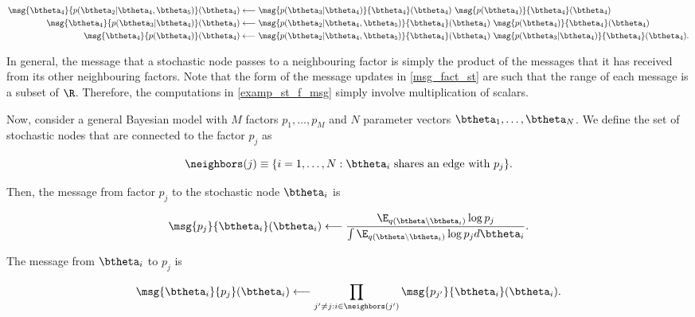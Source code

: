 \documentclass[12pt]{article}
\theoremstyle{plain}
\theoremstyle{definition}
\theoremstyle{remark}
\begin{document}
\begin{align}
\begin{split}
	\msg{\btheta_4}{p (\btheta_2 | \btheta_4, \btheta_5)} (\btheta_4)
		&\longleftarrow
			\msg{p (\btheta_3 | \btheta_4)}{\btheta_4} (\btheta_4) \
			\msg{p(\btheta_4)}{\btheta_4} (\btheta_4) \\
	\msg{\btheta_4}{p (\btheta_3 | \btheta_4)} (\btheta_4)
		&\longleftarrow
			\msg{p (\btheta_2 | \btheta_4, \btheta_5)}{\btheta_4} (\btheta_4) \
			\msg{p (\btheta_4)}{\btheta_4} (\btheta_4) \\
	\msg{\btheta_4}{p (\btheta_4)} (\btheta_4)
		&\longleftarrow
			\msg{p (\btheta_2 | \btheta_4, \btheta_5)}{\btheta_4} (\btheta_4) \
			\msg{p (\btheta_3 | \btheta_4)}{\btheta_4} (\btheta_4).
\end{split}
\label{examp_st_f_msg}
\end{align}

\noindent In general, the message that a stochastic node passes to a neighbouring factor is simply the product
of the messages that it has received from its other neighbouring factors. Note that the form of the message
updates in \eqref{msg_fact_st} are such that the range of each message is a subset of $\R$.
Therefore, the computations in \eqref{examp_st_f_msg} simply involve multiplication of scalars.

Now, consider a general Bayesian model with $M$ factors $p_1, \dots, p_M$ and $N$ parameter vectors
$\btheta_1, \dots, \btheta_N$. We define the set of stochastic nodes that are connected to the factor
$p_j$ as

\[
	\neighbors (j) \equiv \{ i = 1, \dots, N: \text{$\btheta_i$ shares an edge with $p_j$} \}.
\]

\noindent Then, the message from factor
$p_j$ to the stochastic node $\btheta_i$ is

\begin{equation}
	\msg{p_j}{\btheta_i} (\btheta_i)
		\longleftarrow
			\frac{
				\E_{q(\btheta \setminus \btheta_i)} \log p_j
			} {
				\int \E_{q(\btheta \setminus \btheta_i)} \log p_j d\btheta_i
			}.
\label{msg_fact_sn}
\end{equation}

\noindent The message from $\btheta_i$ to $p_j$ is

\begin{equation}
	\msg{\btheta_i}{p_j} (\btheta_i)
		\longleftarrow
			\prod_{j' \neq j : i \in \neighbors(j')} \msg{p_{j'}}{\btheta_i} (\btheta_i).
\label{msg_sn_fact}
\end{equation}
\end{document}
